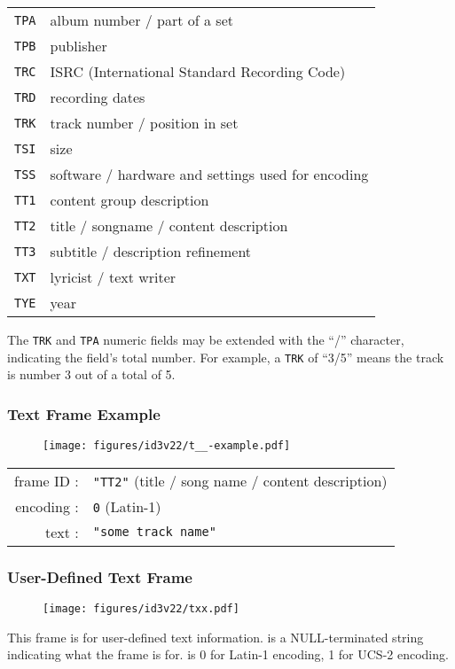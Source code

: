 {\begin{tabular}{r|l}
\texttt{TPA} & album number / part of a set \\
\texttt{TPB} & publisher \\
\texttt{TRC} & ISRC (International Standard Recording Code) \\
\texttt{TRD} & recording dates \\
\texttt{TRK} & track number / position in set \\
\texttt{TSI} & size \\
\texttt{TSS} & software / hardware and settings used for encoding \\
\texttt{TT1} & content group description \\
\texttt{TT2} & title / songname / content description \\
\texttt{TT3} & subtitle / description refinement \\
\texttt{TXT} & lyricist / text writer \\
\texttt{TYE} & year \\
\end{tabular}
}

\clearpage

The \texttt{TRK} and \texttt{TPA} numeric fields may be extended
with the ``/'' character, indicating the field's total number.
For example, a \texttt{TRK} of ``3/5'' means the track is number
3 out of a total of 5.

\subsubsection{Text Frame Example}
\begin{figure}[h]
  \texttt{[image: figures/id3v22/t\_\_-example.pdf]}
\end{figure}
\begin{table}[h]
\begin{tabular}{rl}
frame ID : & \texttt{"TT2"} (title / song name / content description) \\
encoding : & \texttt{0} (Latin-1) \\
text : & \texttt{"some track name"}
\end{tabular}
\end{table}

\subsubsection{User-Defined Text Frame}
\begin{figure}[h]
\texttt{[image: figures/id3v22/txx.pdf]}
\end{figure}
\par
\noindent
This frame is for user-defined text information.
 is a NULL-terminated string indicating
what the frame is for.
 is 0 for Latin-1 encoding, 1 for UCS-2 encoding.

